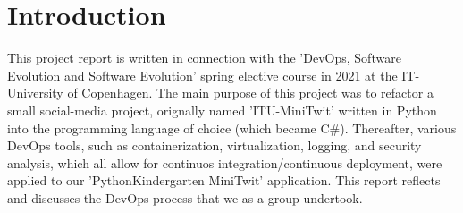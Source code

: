 \section{Introduction}
This project report is written in connection with the 'DevOps, Software Evolution and Software Evolution' spring elective course in 2021 at the IT-University of Copenhagen. The main purpose of this project was to refactor a small social-media project, orignally named 'ITU-MiniTwit' written in Python into the programming language of choice (which became C\#). Thereafter, various DevOps tools, such as containerization, virtualization, logging, and security analysis,  which all allow for continuos integration/continuous deployment, were applied to our 'PythonKindergarten MiniTwit' application. This report reflects and discusses the DevOps process that we as a group undertook. 